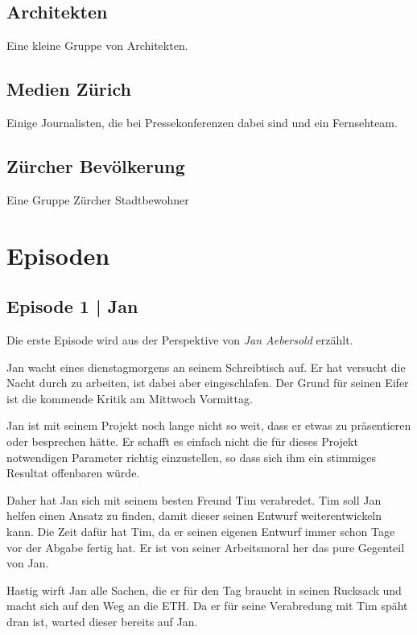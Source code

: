 \documentclass[11pt,a4paper,ngerman]{scrreprt}
\begin{document}
\section*{Architekten}

Eine kleine Gruppe von Architekten.

\section*{Medien Zürich}

Einige Journalisten, die bei Pressekonferenzen dabei sind und ein Fernsehteam.

\section*{Zürcher Bevölkerung}

Eine Gruppe Zürcher Stadtbewohner

\chapter*{Episoden}

\section*{Episode 1 | Jan}

Die erste Episode wird aus der Perspektive von \emph{Jan Aebersold} erzählt.

Jan wacht eines dienstagmorgens an seinem Schreibtisch auf. Er hat versucht die
Nacht durch zu arbeiten, ist dabei aber eingeschlafen. Der Grund für seinen
Eifer ist die kommende Kritik am Mittwoch Vormittag.

Jan ist mit seinem Projekt noch lange nicht so weit, dass er etwas zu
präsentieren oder besprechen hätte. Er schafft es einfach nicht die für dieses
Projekt notwendigen Parameter richtig einzustellen, so dass sich ihm ein
stimmiges Resultat offenbaren würde.

Daher hat Jan sich mit seinem besten Freund Tim verabredet. Tim soll Jan helfen
einen Ansatz zu finden, damit dieser seinen Entwurf weiterentwickeln kann. Die
Zeit dafür hat Tim, da er seinen eigenen Entwurf immer schon Tage vor der Abgabe
fertig hat. Er ist von seiner Arbeitsmoral her das pure Gegenteil von Jan.

Hastig wirft Jan alle Sachen, die er für den Tag braucht in seinen Rucksack und
macht sich auf den Weg an die ETH. Da er für seine Verabredung mit Tim späht
dran ist, warted dieser bereits auf Jan.
\end{document}
